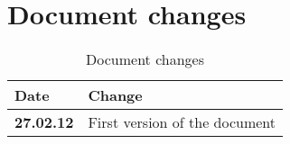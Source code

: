 \section{Document changes}

\begin{table}[h!]
\begin{tabular}{ | p{90pt} | p{270pt}  |}
\hline
\bf Date & \bf Change \\ \hline
\bf 27.02.12  &  First version of the document  \\ \hline

\end{tabular}
\caption{Document changes}
\end{table}